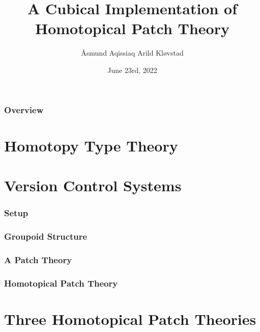 \documentclass{beamer}
\title[A Cubical Implementation of Homotopical Patch Theory]{A Cubical Implementation of Homotopical Patch Theory} %
\author{Åsmund Aqissiaq Arild Kløvstad} %
\institute[UiB] %
{
Universitetet i Bergen \\ %
}
\date{June 23rd, 2022} %
\begin{document}
\begin{frame}
\titlepage %
\end{frame}

\begin{frame}
\frametitle{Overview} %
\tableofcontents %
\end{frame}


\section{Homotopy Type Theory}

  
\section{Version Control Systems}
\begin{frame}
  \frametitle{Setup}
\end{frame}

\begin{frame}
  \frametitle{Groupoid Structure}
\end{frame}

\begin{frame}
  \frametitle{\textbf{A} Patch Theory}
\end{frame}

\begin{frame}
  \frametitle{Homotopical Patch Theory}
\end{frame}


\section{Three Homotopical Patch Theories}
\end{document}
